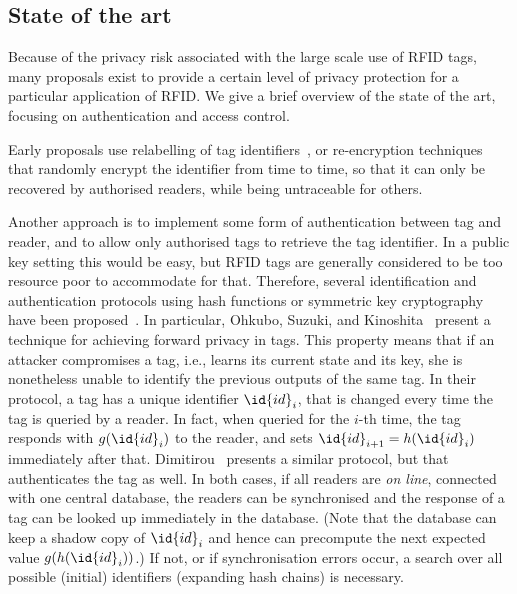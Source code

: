 \subsection{State of the art}
\label{ssec-state}

Because of the privacy risk associated with the large scale use of RFID tags, 
many proposals exist to provide a certain level of privacy
protection for a particular application of RFID. We give a brief overview of
the state of the art, focusing on authentication and access control.

Early proposals use
relabelling of tag identifiers~\cite{sarma2002rfid-report},
or re-encryption 
techniques~\cite{juels2003squealing,avoine2004rfidbanknotes,golle2004reencryption}
that randomly encrypt the identifier from time to time, so that it can only be recovered by authorised readers, while being untraceable for others. 

Another approach is to implement some form of authentication between tag and
reader, and to allow only authorised tags to retrieve the tag identifier.
In a public key setting this would be easy, but RFID tags are generally
considered to be too resource poor to accommodate for that. 
Therefore, several identification and
authentication protocols using hash functions or symmetric key
cryptography have been
proposed~\cite{weis2003security,engberg2004zeroknowledge-rfid}. 
In particular,
Ohkubo, Suzuki, and Kinoshita~\cite{ohkubo2004hash-chains-rfid} present a
technique for achieving forward privacy in tags. This
property means that if an attacker compromises a tag,
i.e., learns its current state and its key, she is nonetheless
unable to identify the previous outputs of the same tag.
In their protocol, a tag has a unique identifier $\id{id}_i$, that is changed
every time the tag is queried by a reader. In fact, when queried for the $i$-th
time, the tag responds with $g(\id{id}_i)$ to the reader, and sets 
$\id{id}_{i+1} = h(\id{id}_i)$ immediately after that. 
Dimitirou~\cite{dimitriou2005lightweight-rfid-protocol} presents a similar
protocol, but that authenticates the tag as well.
In both cases, if all readers are \emph{on line}, connected with one central
database, the readers can be synchronised and the response of a tag can be
looked up immediately in the database. 
(Note that the database can keep a
shadow copy of $\id{id}_i$ and hence can precompute the next expected value
$g(h(\id{id}_i))$.) 
If not, or if synchronisation errors
occur, a search over all possible (initial) identifiers
(expanding hash chains)
is necessary.

